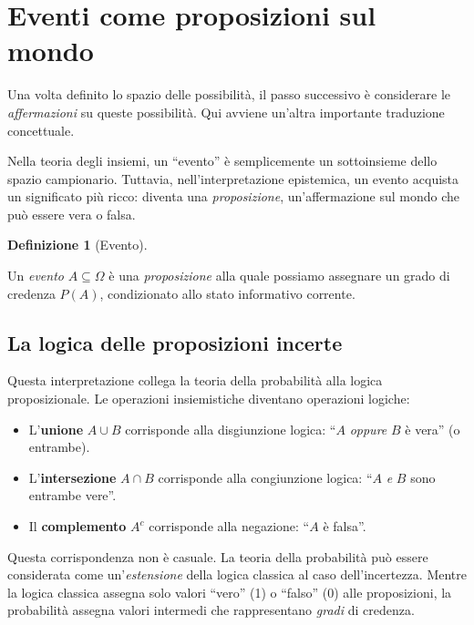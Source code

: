 \documentclass[
  italian,
  letterpaper,
  a4paper,
  11pt,
  open=any]{scrbook}
\providecommand{\tightlist}{%
  \setlength{\itemsep}{0pt}\setlength{\parskip}{0pt}}
\theoremstyle{plain}
\theoremstyle{definition}
\theoremstyle{definition}
\newtheorem{definition}{Definizione}[chapter]
\theoremstyle{remark}
\begin{document}
\section{Eventi come proposizioni sul
mondo}\label{eventi-come-proposizioni-sul-mondo}

Una volta definito lo spazio delle possibilità, il passo successivo è
considerare le \emph{affermazioni} su queste possibilità. Qui avviene
un'altra importante traduzione concettuale.

Nella teoria degli insiemi, un ``evento'' è semplicemente un
sottoinsieme dello spazio campionario. Tuttavia, nell'interpretazione
epistemica, un evento acquista un significato più ricco: diventa una
\emph{proposizione}, un'affermazione sul mondo che può essere vera o
falsa.

\begin{definition}[Evento]\protect\hypertarget{def-event-bayesian}{}\label{def-event-bayesian}

Un \emph{evento} \(A \subseteq \Omega\) è una \emph{proposizione} alla
quale possiamo assegnare un grado di credenza \(P(A)\), condizionato
allo stato informativo corrente.

\end{definition}

\subsection{La logica delle proposizioni
incerte}\label{la-logica-delle-proposizioni-incerte}

Questa interpretazione collega la teoria della probabilità alla logica
proposizionale. Le operazioni insiemistiche diventano operazioni
logiche:

\begin{itemize}
\tightlist
\item
  L'\textbf{unione} \(A \cup B\) corrisponde alla disgiunzione logica:
  ``\(A\) \emph{oppure} \(B\) è vera'' (o entrambe).
\item
  L'\textbf{intersezione} \(A \cap B\) corrisponde alla congiunzione
  logica: ``\(A\) \emph{e} \(B\) sono entrambe vere''.
\item
  Il \textbf{complemento} \(A^c\) corrisponde alla negazione: ``\(A\) è
  falsa''.
\end{itemize}

Questa corrispondenza non è casuale. La teoria della probabilità può
essere considerata come un'\emph{estensione} della logica classica al
caso dell'incertezza. Mentre la logica classica assegna solo valori
``vero'' (1) o ``falso'' (0) alle proposizioni, la probabilità assegna
valori intermedi che rappresentano \emph{gradi} di credenza.
\end{document}
